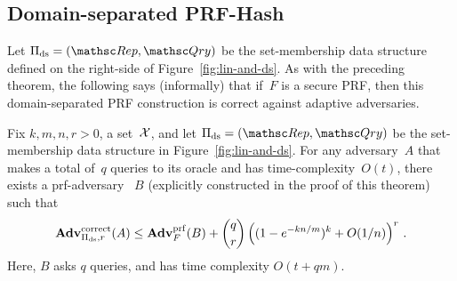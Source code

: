 


\subsection{Domain-separated PRF-Hash}
Let $\setprim_{\mathrm{ds}}= (\Rep, \Qry)$ be the set-membership data
structure defined on the right-side of Figure~\ref{fig:lin-and-ds}.
As with the preceding theorem, the following says (informally) that
if~$F$ is a secure PRF, then this domain-separated PRF construction is
correct against adaptive adversaries.  

\begin{theorem}\label{thm2}\label{thm:ds-correctness}
Fix $k,m,n,r>0$, a set~${\cal X}$, and let $\setprim_{\mathrm{ds}}= (\Rep, \Qry)$ be the set-membership data structure in Figure~\ref{fig:lin-and-ds}.  For any adversary~$A$ that makes a total of~$q$ queries to its oracle and has time-complexity~$O(t)$, there exists a prf-adversary ~$B$ (explicitly constructed in the proof of this theorem) such that
\[
\mathrm{\mathbf{Adv}}^{\mathrm{correct}}_{\Pi_{\mathrm{ds}},r}(A) \leq  \mathbf{Adv}^{\mathrm{prf}}_{F}(B)  + {\dbinom{q}{r}} \left( (1-e^{-kn/m})^k + O(1/n) \right)^r\,.
\]
Here, $B$ asks $q$ queries, and has time complexity $O(t+qm)$.
\end{theorem}

